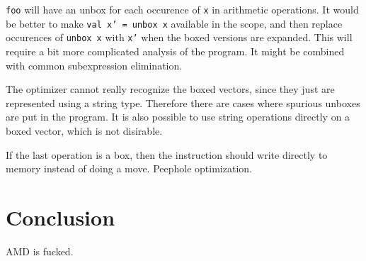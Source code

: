 \documentclass{article}
\begin{document}
\texttt{foo} will have an unbox for each occurence of \texttt{x} in arithmetic operations. It would be better to make \texttt{val x' = unbox x} available in the scope, and then replace occurences of \texttt{unbox x} with \texttt{x'} when the boxed versions are expanded. This will require a bit more complicated analysis of the program. It might be combined with common subexpression elimination.

The optimizer cannot really recognize the boxed vectors, since they just are represented using a string type. Therefore there are cases where spurious unboxes are put in the program. It is also possible to use string operations directly on a boxed vector, which is not disirable.

If the last operation is a box, then the instruction should write directly to memory instead of doing a move. Peephole optimization.

\section{Conclusion}

AMD is fucked.




\end{document}
